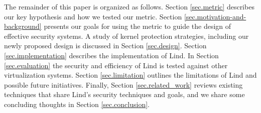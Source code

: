 The remainder of this paper is organized as follows.
Section \ref{sec.metric} describes our key hypothesis and
how we tested our metric.
Section \ref{sec.motivation-and-background} presents our goals for using the metric to guide the design
of effective security systems.
A study of kernel protection strategies, including our newly proposed design
is discussed in Section \ref{sec.design}. Section \ref{sec.implementation}
describes the implementation of Lind. In Section \ref{sec.evaluation} the security and
efficiency of Lind is tested against other virtualization systems.
Section \ref{sec.limitation} outlines the
limitations of Lind and possible future initiatives.
Finally, Section \ref{sec.related_work} reviews existing techniques that share
Lind's security techniques and goals, and we share some concluding thoughts in
Section \ref{sec.conclusion}.







